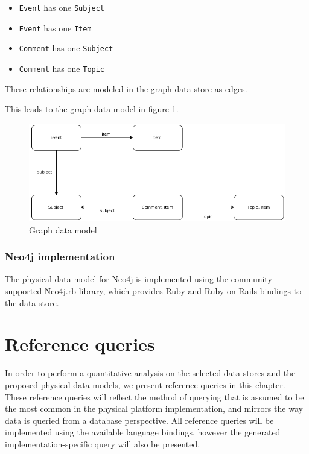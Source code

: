 \begin{itemize}
  \item \texttt{Event} has one \texttt{Subject}
  \item \texttt{Event} has one \texttt{Item}
  \item \texttt{Comment} has one \texttt{Subject}
  \item \texttt{Comment} has one \texttt{Topic}
\end{itemize}

These relationships are modeled in the graph data store as edges.

This leads to the graph data model in figure \ref{fig:graph-model}.

\begin{figure}
  \centering
  \includegraphics[width=.8\textwidth]{img/graph-model.png}
  \caption{Graph data model}
  \label{fig:graph-model}
\end{figure}

\subsubsection{Neo4j implementation}
\label{subsubsec:neo4j-implementation}

The physical data model for Neo4j is implemented using the community-supported Neo4j.rb library, which provides Ruby and Ruby on Rails bindings to the data store.

\section{Reference queries}
\label{sec:reference-queries}


In order to perform a quantitative analysis on the selected data stores and the proposed physical data models, we present  reference queries in this chapter.
These reference queries will reflect the method of querying that is assumed to be the most common in the physical platform implementation, and mirrors the way data is queried from a database perspective.
All reference queries will be implemented using the available language bindings, however the generated implementation-specific query will also be presented.

